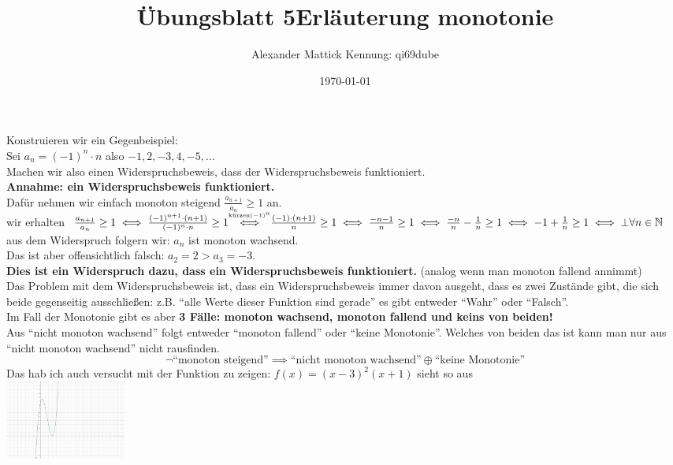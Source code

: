 \documentclass{article}
\title{Übungsblatt 5}
\author{
Alexander Mattick Kennung: qi69dube}
\date{\today}
\title{Erläuterung monotonie}
\begin{document}
	\maketitle\noindent
	Konstruieren wir ein Gegenbeispiel:\\
	Sei $a_n = (-1)^n\cdot n$ also $-1,2,-3,4,-5,\dots$\\
	Machen wir also einen Widerspruchsbeweis, dass der Widerspruchsbeweis funktioniert.\\
	\textbf{Annahme: ein Widerspruchsbeweis funktioniert.}\\
	Dafür nehmen wir einfach monoton steigend $\frac{a_{n+1}}{a_n} \geq 1$ an.\\
	wir erhalten $\frac{a_{n+1}}{a_n}\geq 1 \iff \frac{(-1)^{n+1}\cdot (n+1)}{(-1)^n\cdot n}\geq 1 \stackon{$\iff$}{$\scriptscriptstyle\text{kürzen}(-1)^n$}{} \frac{(-1)\cdot (n+1)}{n}\geq 1\iff \frac{-n-1}{n} \geq 1\iff \frac{-n}{n}-\frac{1}{n} \geq 1\iff -1+\frac{1}{n}\geq 1\iff \bot \forall n\in\mathbb{N}$\\
	aus dem Widerspruch folgern wir: $a_n$ ist monoton wachsend.\\
	Das ist aber offensichtlich falsch: $a_2=2> a_3=-3$.\\
	\textbf{Dies ist ein Widerspruch dazu, dass ein Widerspruchsbeweis funktioniert.} (analog wenn man monoton fallend annimmt)\\
	Das Problem mit dem Widerspruchsbeweis ist, dass ein Widerspruchsbeweis immer davon ausgeht, dass es zwei Zustände gibt, die sich beide gegenseitig ausschließen: z.B. ``alle Werte dieser Funktion sind gerade'' es gibt entweder ``Wahr'' oder ``Falsch''.\\
	Im Fall der Monotonie gibt es aber \textbf{3 Fälle: monoton wachsend, monoton fallend und keins von beiden!}\\
	Aus ``nicht monoton wachsend'' folgt entweder ``monoton fallend'' oder ``keine Monotonie''. Welches von beiden das ist kann man nur aus ``nicht monoton wachsend'' nicht rausfinden.\\
	\[\lnot \text{``monoton steigend''} \implies \text{``nicht monoton wachsend''}\oplus\text{``keine Monotonie''}\]
	Das hab ich auch versucht mit der Funktion zu zeigen: $f(x)=(x-3)^2(x+1)$ sieht so aus\\
	\includegraphics[width=150px]{images/montonie.png}\\
\end{document}
